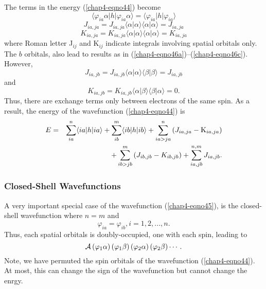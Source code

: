 {The terms in the energy (\ref{chap4-eqno44}) become
\begin{equation}
\langle \varphi_{ia} \alpha | h | \varphi_{ia} \alpha \rangle = \langle 
\varphi_{ia} | h | \varphi_{ia} \rangle
\label{chap4-eqno46a}
\end{equation}
\begin{equation}
J_{ia,ja} = J_{ia,ja} \langle \alpha | \alpha \rangle \langle 
\alpha | \alpha \rangle = J_{ia,ja}
\label{chap4-eqno46b}
\end{equation}
\begin{equation}
K_{ia,ja} = K_{ia,ja} \langle \alpha | \alpha \rangle \langle 
\alpha | \alpha \rangle = K_{ia,ja}
\label{chap4-eqno46c}
\end{equation}
where Roman letter J$_{ij}$ and K$_{ij}$ indicate integrals involving
spatial orbitals only.  The $b$ orbitals, also lead to results as in
(\ref{chap4-eqno46a})--(\ref{chap4-eqno46c}).  However,
\begin{equation}
J_{ia,jb} = J_{ia,jb} \langle \alpha | \alpha \rangle \langle 
\beta | \beta \rangle = J_{ia,jb}
\end{equation}
and
\begin{equation}
K_{ia,jb} = K_{ia,jb} \langle \alpha | \beta \rangle \langle \beta | 
\alpha \rangle = 0.
\end{equation}
Thus, there are exchange terms only between electrons of the same
spin.  As a result, the energy of the wavefunction
(\ref{chap4-eqno44}) is
\begin{eqnarray}
E &=& \sum^{n}_{ia} \langle ia | h | ia \rangle + \sum^{m}_{ib} \langle 
ib | h | ib \rangle + \sum^{n}_{ia>ja} \left( J_{ia,ja} - {\rm 
K}_{ia,ja} \right)\\
&&+ \sum^{m}_{ib>jb} \left( J_{ib,jb} - K_{ib,jb} \right) + 
\sum^{n,m}_{ia,jb} J_{ia,jb}.\cr
%
\label{chap4-eqno47}
\end{eqnarray}

\subsubsection{Closed-Shell Wavefunctions}

A very important special case of the wavefunction
(\ref{chap4-eqno45}), is the closed-shell wavefunction where $n = m$
and
\begin{equation}
\varphi_{ia} = \varphi_{ib} , i = 1 , 2 , . . . , n .
\end{equation}
Thus, each spatial orbitals is doubly-occupied, one with each spin, leading to
\begin{equation}
{\cal A} \left( \varphi_1 \alpha \right) \left( \varphi_1 \beta \right) \left( 
\varphi_2 \alpha \right) \left( \varphi_2 \beta \right) \cdots .
\label{chap4-eqno48}
\end{equation}
Note, we have permuted the spin orbitals of the wavefunction
(\ref{chap4-eqno44}).  At most, this can change the sign of the
wavefunction but cannot change the enrgy.

}
